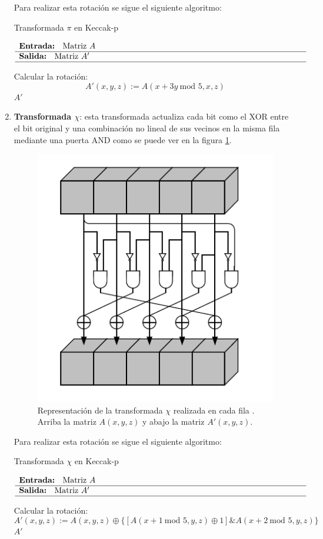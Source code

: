 \begin{enumerate}
	Para realizar esta rotación se sigue el siguiente algoritmo:
	\begin{algorithm}[H]
		\caption{Transformada \(\pi\) en Keccak-p}
		$\begin{array}{p{\textwidth}}
			\textbf{Entrada: } Matriz \(A\) \\ 
			\hline
			\textbf{Salida: } Matriz \(A'\) \\ 
			\hline
		\end{array}$
		\begin{algorithmic}[1]
			\State Calcular la rotación:
			\begin{equation}
				A'(x,y,z):=A(x+3y \ \text{mod } 5,x,z)
			\end{equation}
			\State \Return \(A'\)
		\end{algorithmic}
	\end{algorithm}
	
	
	\item \textbf{Transformada \(\chi\)}: esta transformada actualiza cada bit como el XOR entre el bit original y una combinación no lineal de sus vecinos en la misma fila mediante una puerta AND como se puede ver en la figura \ref{fig:chitransform}.
	
	\begin{figure}[H]
		\centering
		\includegraphics[width=0.4\linewidth]{figuras/PartsState1}
		\caption{Representación de la transformada $\chi$ realizada en cada fila \cite{FIPS202}. Arriba la matriz \(A(x,y,z)\) y abajo la matriz \(A'(x,y,z)\).}
		\label{fig:chitransform}
	\end{figure}
	\newpage
	Para realizar esta rotación se sigue el siguiente algoritmo:
	\begin{algorithm}[H]
		\caption{Transformada \(\chi\) en Keccak-p}
		$\begin{array}{p{\textwidth}}
			\textbf{Entrada: } Matriz \(A\) \\ 
			\hline
			\textbf{Salida: } Matriz \(A'\) \\ 
			\hline
		\end{array}$
		\begin{algorithmic}[1]
			\State Calcular la rotación:
			\begin{equation}
				A'(x,y,z):=A(x,y,z)\oplus\{[A(x+1 \ \text{mod } 5 ,y,z)\oplus 1]\& A(x+2 \ \text{mod } 5 ,y,z)\}
			\end{equation}
			\State \Return \(A'\)
		\end{algorithmic}
	\end{algorithm}
	

\end{enumerate}
